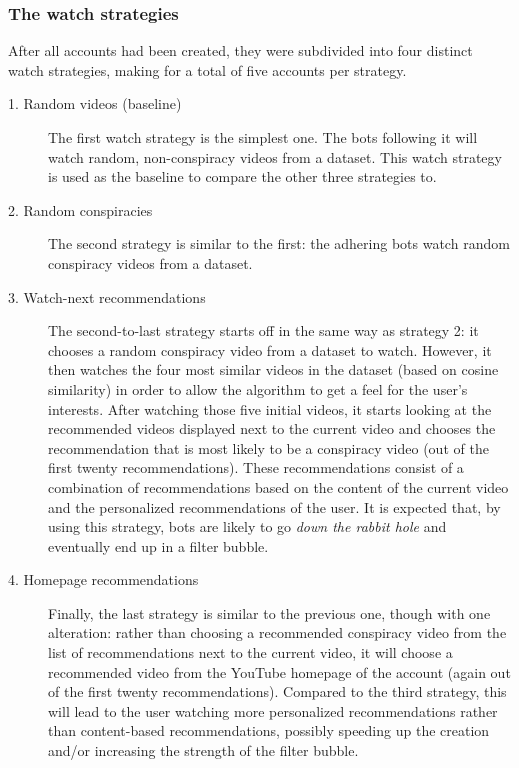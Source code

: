 \documentclass[../main.tex]{subfiles}
\begin{document}
\subsubsection{The watch strategies}
After all accounts had been created, they were subdivided into four distinct watch strategies, making for
a total of five accounts per strategy. 

\begin{description}
\item[1. Random videos (baseline)] The first watch strategy is the simplest one. The bots following 
it will watch random, non-conspiracy videos from a dataset. This watch strategy is used as the 
baseline to compare the other three strategies to.

\item[2. Random conspiracies] The second strategy is similar to the first: the 
adhering bots watch random conspiracy videos from a dataset. 

\item[3. Watch-next recommendations] The second-to-last strategy starts off in the same way as strategy 2: it 
chooses a random conspiracy video from a dataset to watch. However, it then watches the four most similar 
videos in the dataset (based on cosine similarity) in order to allow the algorithm to get a feel for the 
user's interests. After watching those five initial videos, it starts looking at the recommended videos 
displayed next to the current video and chooses the recommendation that is most likely to be a conspiracy 
video (out of the first twenty recommendations). These recommendations consist of a combination of 
recommendations based on the content of the current video and the personalized recommendations of the 
user. It is expected that, by using this strategy, bots are likely to go \textit{down the rabbit hole} and eventually 
end up in a filter bubble.

\item[4. Homepage recommendations] Finally, the last strategy is similar to the previous one, though
with one alteration: rather than choosing a recommended conspiracy video from the list of recommendations 
next to the current video, it will choose a recommended video from the YouTube homepage of the account 
(again out of the first twenty recommendations). Compared to the third strategy, this will lead to the user
watching more personalized recommendations rather than content-based recommendations, possibly speeding up 
the creation and/or increasing the strength of the filter bubble.

\end{description}
\end{document}
